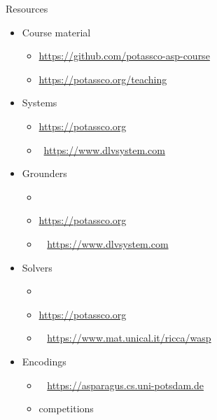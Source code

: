 \begin{frame}{Resources}
  \begin{itemize}
  \item Course material
    \begin{itemize}
    \item \url{https://github.com/potassco-asp-course}
    \item \url{https://potassco.org/teaching}
    \end{itemize}
  \item Systems
    \begin{itemize}
    \item \alert{\clingo} \cite{gekakasc17a}\hfill \url{https://potassco.org}
    \item \dlv\           \cite{dlv03a,alcadofuleperiveza17a}\hfill \url{https://www.dlvsystem.com}
    \end{itemize}
  \item Grounders
    \begin{itemize}
    \item \lparse\                                                %
    \item \alert{\gringo} \cite{gescth07a,gekaosscth09a,gekakosc11a}\hfill \url{https://potassco.org}
    \item \idlv\          \cite{cafupeza17a}                        \hfill\url{https://www.dlvsystem.com}
    \end{itemize}
  \item Solvers
    \begin{itemize}
    \item \smodels\       \cite{niesim96a,siniso02a}              %
    \item \alert{\clasp}  \cite{gekanesc07a,gekasc09c}              \hfill \url{https://potassco.org}
    \item \wasp\          \cite{aldofaleri13a}                      \hfill \url{https://www.mat.unical.it/ricca/wasp}
    \end{itemize}
  \item Encodings
    \begin{itemize}
    \item \asparagus\     \cite{boansctr04a}                        \hfill \url{https://asparagus.cs.uni-potsdam.de}
    \item competitions \cite{contest07a,contest09a,contest11a,contest11a,cagemari14a}
    \end{itemize}
  \end{itemize}
\end{frame}
%
